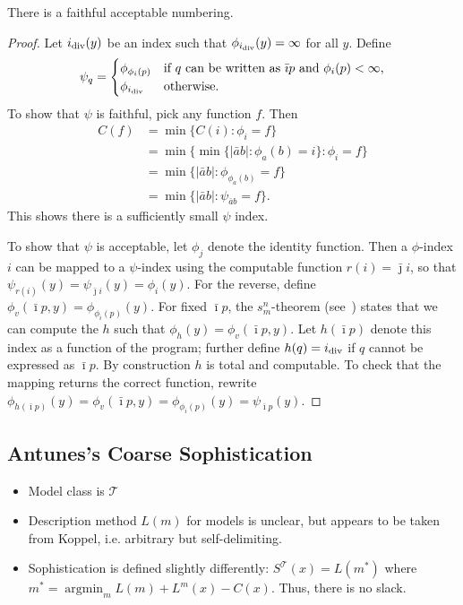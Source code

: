 \documentclass{style/llncs}
\newcommand{\T}{\mathcal T}
\newcommand{\tn}[1]{\textnormal{#1}}
\newcommand{\argmin}{\mathop{\arg\min}}
\begin{document}
\begin{lemma}
  There is a faithful acceptable numbering.
\end{lemma}
\begin{proof}
Let $i_\tn{div}(y)$ be an index such that $\phi_{i_\tn{div}}(y)=\infty$ for all $y$. Define
  \[\psi_q=\begin{cases}
    \phi_{\phi_i(p)}&\tn{if $q$ can be written as $\bar\imath p$ and $\phi_i(p)<\infty$,}\\
    \phi_{i_\tn{div}}&\tn{otherwise.}\end{cases}
  \]
  To show that $\psi$ is faithful, pick any function $f$. Then
\[\begin{split}
C(f)&=\min\{C(i):\phi_i=f\}\\
&=\min\{\min\{|\bar a b|:\phi_a(b)=i\}:\phi_i=f\}\\
&=\min\{|\bar a b|:\phi_{\phi_a(b)}=f\}\\
&=\min\{|\bar a b|:\psi_{\bar a b}=f\}.
\end{split}\]
This shows there is a sufficiently small $\psi$ index.

To show that $\psi$ is acceptable, let $\phi_j$ denote the identity
function. Then a $\phi$-index $i$ can be mapped to a $\psi$-index
using the computable function $r(i)=\bar\jmath i$, so that
$\psi_{r(i)}(y)=\psi_{\bar\jmath i}(y)=\phi_i(y)$. For the reverse,
define $\phi_v(\bar\imath p, y)=\phi_{\phi_i(p)}(y)$. For fixed
$\bar\imath p$, the 
$s^n_m$-theorem (see~\cite{TODO}) states that we can compute the $h$
such that $\phi_h(y)=\phi_v(\bar\imath p,y)$. Let $h(\bar\imath p)$
denote this index as a function of the program; further define
$h(q)=i_\tn{div}$ if $q$ cannot be expressed as $\bar\imath p$. By
construction $h$ is total and computable. To check that the mapping
returns the correct function, rewrite $\phi_{h(\bar\imath
  p)}(y)=\phi_v(\bar\imath p,y)=\phi_{\phi_i(p)}(y)=\psi_{\bar\imath p}(y)$.
\end{proof}

\subsection{Antunes's Coarse Sophistication}

\begin{itemize}
\item Model class is $\T$
\item Description method $L(m)$ for models is unclear, but appears to be
  taken from Koppel, i.e. arbitrary but self-delimiting.
\item Sophistication is defined slightly differently: $S^\T(x)=L(m^*)$ where $m^*=\argmin_m L(m)+L^m(x)-C(x)$. Thus, there is no slack.
\end{itemize}
\end{document}
